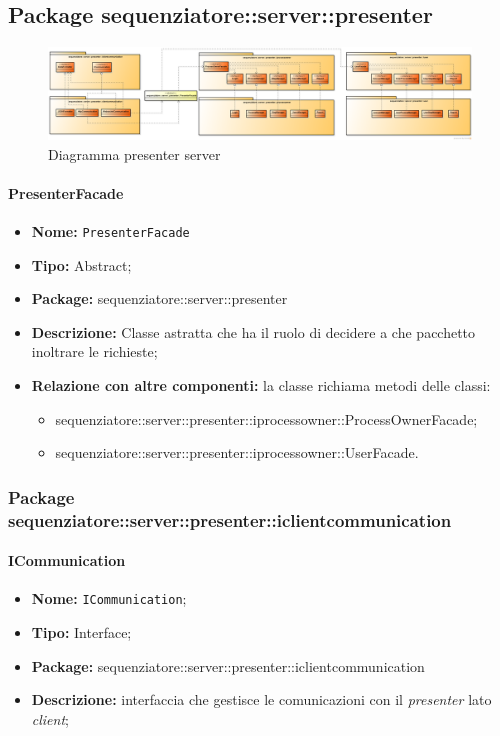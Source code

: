 \subsection{Package sequenziatore::server::presenter}
\begin{figure}[H] \centering \includegraphics[width=%
\textwidth]
{./pack/ClassiServerSoloPresenter.png} \caption{Diagramma presenter server}
\end{figure}
\paragraph{PresenterFacade}
	\begin{itemize}
		\item \textbf{Nome:} \texttt{PresenterFacade}
		\item \textbf{Tipo:} Abstract;
		\item \textbf{Package:} sequenziatore::server::presenter
		\item \textbf{Descrizione:} Classe astratta che ha il ruolo di decidere a che pacchetto inoltrare le richieste;
		\item \textbf{Relazione con altre componenti:} la classe richiama metodi delle classi:
		\begin{itemize}
			\item sequenziatore::server::presenter::iprocessowner::ProcessOwnerFacade;
			\item sequenziatore::server::presenter::iprocessowner::UserFacade.
		\end{itemize}
	\end{itemize}
\subsubsection{Package sequenziatore::server::presenter::iclientcommunication}
\paragraph{ICommunication}
	\begin{itemize}
		\item \textbf{Nome:} \texttt{ICommunication};
		\item \textbf{Tipo:} Interface;
		\item \textbf{Package:} sequenziatore::server::presenter::iclientcommunication
		\item \textbf{Descrizione:} interfaccia che gestisce le comunicazioni con il \textit{presenter} lato \textit{client};
	\end{itemize}
